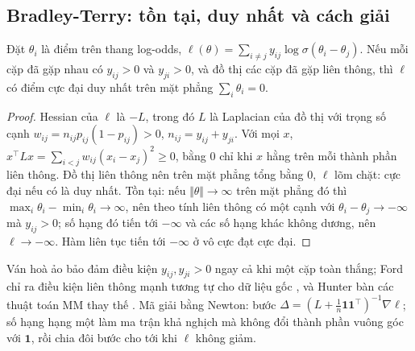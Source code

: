 \subsection{Bradley-Terry: tồn tại, duy nhất và cách giải}
\begin{dinhly}
\label{dl:cs-bt}
Đặt $\theta_i$ là điểm trên thang log-odds, $\ell(\theta)=\sum_{i\ne j}y_{ij}\log\sigma(\theta_i-\theta_j)$. Nếu mỗi
cặp đã gặp nhau có $y_{ij}>0$ và $y_{ji}>0$, và đồ thị các cặp đã gặp liên thông, thì $\ell$ có điểm cực đại duy
nhất trên mặt phẳng $\sum_i\theta_i=0$.
\end{dinhly}
\begin{proof}
Hessian của $\ell$ là $-L$, trong đó $L$ là Laplacian của đồ thị với trọng số cạnh
$w_{ij}=n_{ij}p_{ij}(1-p_{ij})>0$, $n_{ij}=y_{ij}+y_{ji}$. Với mọi $x$, $x^\top Lx=\sum_{i<j}w_{ij}(x_i-x_j)^2\ge0$,
bằng 0 chỉ khi $x$ hằng trên mỗi thành phần liên thông. Đồ thị liên thông nên trên mặt phẳng tổng bằng 0, $\ell$
lõm chặt: cực đại nếu có là duy nhất. Tồn tại: nếu $\Vert\theta\Vert\to\infty$ trên mặt phẳng đó thì
$\max_i\theta_i-\min_i\theta_i\to\infty$, nên theo tính liên thông có một cạnh với $\theta_i-\theta_j\to-\infty$ mà
$y_{ij}>0$; số hạng đó tiến tới $-\infty$ và các số hạng khác không dương, nên $\ell\to-\infty$. Hàm liên tục tiến
tới $-\infty$ ở vô cực đạt cực đại.
\end{proof}
Ván hoà ảo bảo đảm điều kiện $y_{ij},y_{ji}>0$ ngay cả khi một cặp toàn thắng; Ford chỉ ra điều kiện liên thông
mạnh tương tự cho dữ liệu gốc \cite{ford1957}, và Hunter bàn các thuật toán MM thay thế \cite{hunter2004}. Mã giải
bằng Newton: bước $\Delta=(L+\tfrac1n\mathbf 1\mathbf 1^\top)^{-1}\nabla\ell$; số hạng hạng một làm ma trận khả
nghịch mà không đổi thành phần vuông góc với $\mathbf 1$, rồi chia đôi bước cho tới khi $\ell$ không giảm.

